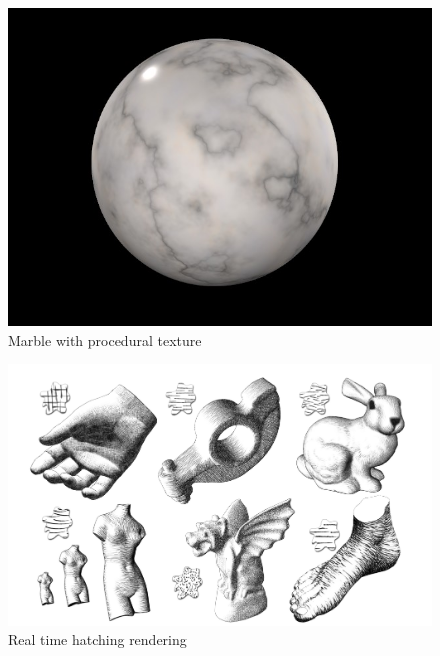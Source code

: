 \begin{figure}[H]
    \begin{center}
    \includegraphics[scale=0.2]{images/marble.jpg}
    \end{center}
    \caption{Marble with procedural texture}
    \label{marble_rendering}
\end{figure}


\begin{figure}[H]
    \begin{center}
    \includegraphics[scale=0.2]{pics/hatching.png}
    \end{center}
    \caption{Real time hatching rendering \cite{praun_real-time_2001}}
    \label{hatching_rendering}
\end{figure}

